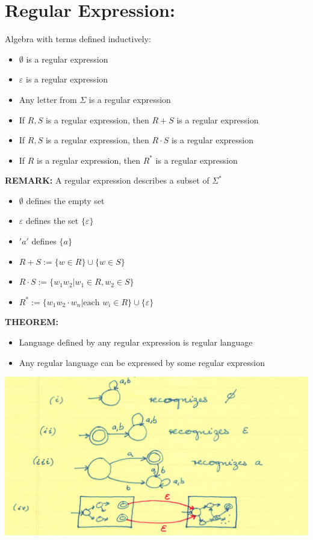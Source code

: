 \documentclass [9 pt]{article}
\theoremstyle{definition}
\begin{document}
\section*{Regular Expression:}
Algebra with terms defined inductively:
\begin{itemize}
	\item $\emptyset$ is a regular expression
	\item $\varepsilon$ is a regular expression
	\item Any letter from $\Sigma$ is a regular expression
	\item If $R, S$ is a regular expression, then $R+S$ is a regular expression
	\item  If $R, S$ is a regular expression, then $R\cdot S$ is a regular expression
	\item  If $R$ is a regular expression, then $R^*$ is a regular expression
\end{itemize}
\textbf{REMARK:} A regular expression describes a subset of $\Sigma^*$
\begin{itemize}
	\item $\emptyset$ defines the empty set
	\item $\varepsilon$ defines the set $\{ \varepsilon \}$	
	\item $'a'$ defines $\{a \}$
	\item $R+S:= \{w \in R \} \cup \{ w \in S\}$ 
	\item  $R\cdot S:= \{w_1 w_2| w_1 \in R, w_2 \in S \}$
	\item  $R^* := \{w_1 w_2 \cdot w_n| \text{each } w_i \in R \} \cup \{ \varepsilon \}$
\end{itemize}
\textbf{THEOREM:}
\begin{itemize}
	\item Language defined by any regular expression is regular language
	\item Any regular language can be expressed by some regular expression
\end{itemize}
\includegraphics[scale = 0.7]{1.png}\\
\end{document}
